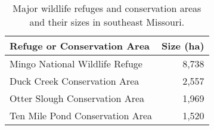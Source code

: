 \begin{table}[h]
\centering
\begin{threeparttable}
\caption[Major wildlife refuges and conservation areas in southeast Missouri.]{Major wildlife refuges and conservation areas and their sizes in southeast Missouri.}\label{tab:se_mo_refuges}
\noindent\begin{tabular}[l]{@{}lr@{}}
\toprule
Refuge or Conservation Area & Size (ha)\tabularnewline
\midrule
Mingo National Wildlife Refuge & 8,738\tabularnewline
Duck Creek Conservation Area & 2,557\tabularnewline
Otter Slough Conservation Area & 1,969\tabularnewline
Ten Mile Pond Conservation Area & 1,520\tabularnewline
\bottomrule
\end{tabular}
\end{threeparttable}
\end{table}
